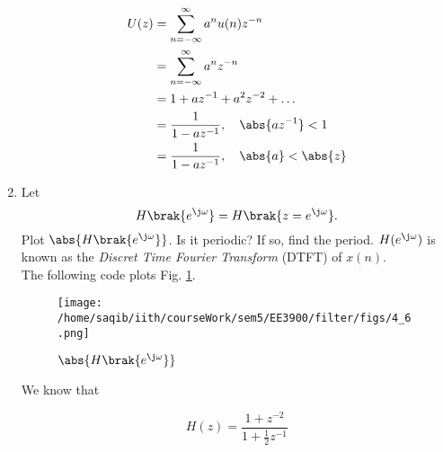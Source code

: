 \documentclass[journal,12pt,twocolumn]{IEEEtran}
\renewcommand\thesection{\arabic{section}}
\begin{document}
\begin{enumerate}[label=\thesection.\arabic*]
\begin{align}
	U(z) &= \sum _{n= -\infty}^{\infty}a^nu(n)z^{-n}
	\\&=\sum _{n= -\infty}^{\infty}a^nz^{-n}
	\\&= 1+az^{-1}+a^2z^{-2}+\dots
	\\&=\frac{1}{1-az^{-1}}, \quad \abs{az^{-1}} <1
	\\&=\frac{1}{1-az^{-1}}, \quad \abs{a} <\abs{z}
\end{align}
\item 
Let
\begin{equation}
H\brak{e^{\j \omega}} = H\brak{z = e^{\j \omega}}.
\end{equation}
Plot $\abs{H\brak{e^{\j \omega}}}$.  Is it periodic? If so, find the period. $H(e^{\j \omega})$ is
known as the {\em Discret Time Fourier Transform} (DTFT) of $x(n)$.
\\
\solution The following code plots Fig. \ref{fig:dtft}.

\begin{figure}[!ht]
\centering
\texttt{[image: /home/saqib/iith/courseWork/sem5/EE3900/filter/figs/4\_6.png]}
\caption{$\abs{H\brak{e^{\j\omega}}}$}
\label{fig:dtft}
\end{figure}
We know that 

\begin{equation}
	H(z) = \frac{1 + z^{-2}}{1 + \frac{1}{2}z^{-1}}	
\end{equation}


\end{enumerate}
\end{document}
